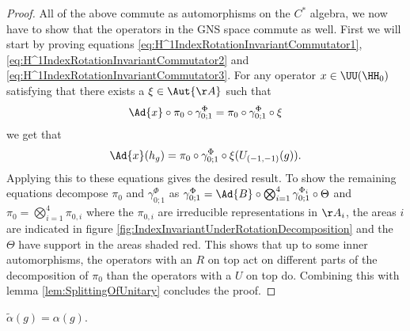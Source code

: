 \begin{proof}
	All of the above commute as automorphisms on the $C^*$ algebra, we now have to show that the operators in the GNS space commute as well. First we will start by proving equations \eqref{eq:H^1IndexRotationInvariantCommutator1}, \eqref{eq:H^1IndexRotationInvariantCommutator2} and \eqref{eq:H^1IndexRotationInvariantCommutator3}. For any operator $x\in\UU(\HH_0)$ satisfying that there exists a $\xi\in\Aut{\AA}$ such that
	\begin{equation}
		\Ad{x}\circ\pi_0\circ\gamma^{\Phi}_{0;1}=\pi_0\circ\gamma^{\Phi}_{0;1}\circ\xi
	\end{equation}
	we get that
	\begin{equation}
		\Ad{x}(h_g)=\pi_0\circ\gamma^\Phi_{0;1}\circ\xi(U_{(-1,-1)}(g)).
	\end{equation}
	Applying this to these equations gives the desired result. To show the remaining equations decompose $\pi_0$ and $\gamma^\Phi_{0;1}$ as $\gamma^\Phi_{0;1}=\Ad{B}\circ\bigotimes_{i=1}^4\gamma^{\Phi_i}_{0;1}\circ\Theta$ and $\pi_0=\bigotimes_{i=1}^4\pi_{0,i}$ where the $\pi_{0,i}$ are irreducible representations in $\AA_i$, the areas $i$ are indicated in figure \ref{fig:IndexInvariantUnderRotationDecomposition} and the $\Theta$ have support in the areas shaded red. This shows that up to some inner automorphisms, the operators with an $R$ on top act on different parts of the decomposition of $\pi_0$ than the operators with a $U$ on top do. Combining this with lemma \ref{lem:SplittingOfUnitary} concludes the proof.
\end{proof}
\begin{lemma}
	$\tilde{\alpha}(g)=\alpha(g)$.
\end{lemma}
